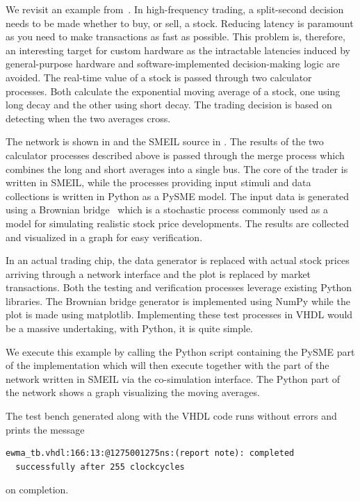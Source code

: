 We revisit an example from~\cite{asheim2016vhdl}. In high-frequency trading, a
split-second decision needs to be made whether to buy, or sell, a
stock. Reducing latency is paramount as you need to make transactions as fast as
possible. This problem is, therefore, an interesting target for custom hardware
as the intractable latencies induced by general-purpose hardware and
software-implemented decision-making logic are avoided. The real-time value of a
stock is passed through two calculator processes. Both calculate the exponential
moving average of a stock, one using long decay and the other using short
decay. The trading decision is based on detecting when the two averages
cross.~\cite{kablan2012use}

The network is shown in  and the SMEIL source in
. The results of the two calculator processes described above
is passed through the merge process which combines the long and short averages
into a single bus. The core of the trader is written in SMEIL, while the
processes providing input stimuli and data collections is written in Python as a
PySME model. The input data is generated using a Brownian
bridge~\cite{glasserman2003monte} which is a stochastic process commonly used as
a model for simulating realistic stock price developments. The results are
collected and visualized in a graph for easy verification.

In an actual trading chip, the data generator is replaced with actual stock
prices arriving through a network interface and the plot is replaced by market
transactions. Both the testing and verification processes leverage existing
Python libraries. The Brownian bridge generator is implemented using NumPy while
the plot is made using {\ttfamily matplotlib}. Implementing these test processes
in VHDL would be a massive undertaking, with Python, it is quite simple.

We execute this example by calling the Python script containing the PySME part
of the implementation which will then execute together with the part of the
network written in SMEIL via the co-simulation interface. The Python part of the
network shows a graph visualizing the moving averages.

The test bench generated along with the VHDL code runs without errors and prints
the message
\begin{verbatim}
ewma_tb.vhdl:166:13:@1275001275ns:(report note): completed
  successfully after 255 clockcycles
\end{verbatim}
on completion.

